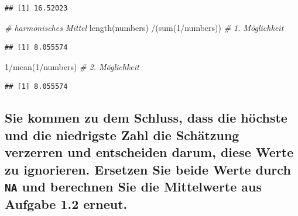 \documentclass[12pt,a4paper]{article}
\newenvironment{Shaded}{\begin{snugshade}}{\end{snugshade}}
\newcommand{\CommentTok}[1]{\textcolor[rgb]{0.56,0.35,0.01}{\textit{#1}}}
\newcommand{\DecValTok}[1]{\textcolor[rgb]{0.00,0.00,0.81}{#1}}
\newcommand{\FunctionTok}[1]{\textcolor[rgb]{0.00,0.00,0.00}{#1}}
\newcommand{\NormalTok}[1]{#1}
\newcommand{\SpecialCharTok}[1]{\textcolor[rgb]{0.00,0.00,0.00}{#1}}
\begin{document}
\begin{verbatim}
## [1] 16.52023
\end{verbatim}

\begin{Shaded}
\begin{Highlighting}[]
    \CommentTok{\# harmonisches Mittel}
    \FunctionTok{length}\NormalTok{(numbers) }\SpecialCharTok{/}\NormalTok{(}\FunctionTok{sum}\NormalTok{(}\DecValTok{1}\SpecialCharTok{/}\NormalTok{numbers))       }\CommentTok{\# 1. Möglichkeit}
\end{Highlighting}
\end{Shaded}

\begin{verbatim}
## [1] 8.055574
\end{verbatim}

\begin{Shaded}
\begin{Highlighting}[]
    \DecValTok{1}\SpecialCharTok{/}\FunctionTok{mean}\NormalTok{(}\DecValTok{1}\SpecialCharTok{/}\NormalTok{numbers)                       }\CommentTok{\# 2. Möglichkeit}
\end{Highlighting}
\end{Shaded}

\begin{verbatim}
## [1] 8.055574
\end{verbatim}

\vspace{0.5cm}

\hypertarget{sie-kommen-zu-dem-schluss-dass-die-huxf6chste-und-die-niedrigste-zahl-die-schuxe4tzung-verzerren-und-entscheiden-darum-diese-werte-zu-ignorieren.-ersetzen-sie-beide-werte-durch-und-berechnen-sie-die-mittelwerte-aus-aufgabe-1.2-erneut.}{%
\subsection{\texorpdfstring{Sie kommen zu dem Schluss, dass die höchste
und die niedrigste Zahl die Schätzung verzerren und entscheiden darum,
diese Werte zu ignorieren. Ersetzen Sie beide Werte durch \texttt{NA}
und berechnen Sie die Mittelwerte aus Aufgabe 1.2
erneut.}{Sie kommen zu dem Schluss, dass die höchste und die niedrigste Zahl die Schätzung verzerren und entscheiden darum, diese Werte zu ignorieren. Ersetzen Sie beide Werte durch  und berechnen Sie die Mittelwerte aus Aufgabe 1.2 erneut.}}\label{sie-kommen-zu-dem-schluss-dass-die-huxf6chste-und-die-niedrigste-zahl-die-schuxe4tzung-verzerren-und-entscheiden-darum-diese-werte-zu-ignorieren.-ersetzen-sie-beide-werte-durch-und-berechnen-sie-die-mittelwerte-aus-aufgabe-1.2-erneut.}}
\end{document}

